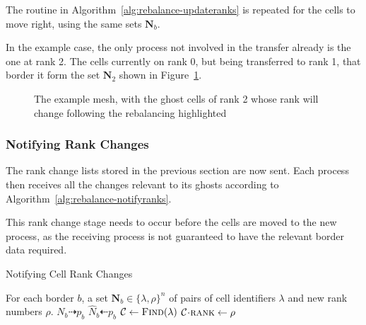 \documentclass[twoside]{IIBproject}
\newcommand{\vect} [1] {\bm{#1}}
\newcommand{\dra}{\dashrightarrow}
\newcommand{\dla}{\dashleftarrow}
\newcommand{\acc}{{\mkern 0.5mu\cdot\mkern 0.5mu}}
\numberwithin{figure}{section}
\begin{document}
            The routine in Algorithm~\ref{alg:rebalance-updateranks} is repeated for the cells to move right, using the same sets $\vect{N}_b$.

            In the example case, the only process not involved in the transfer already is the one at rank 2. The cells currently on rank 0, but being transferred to rank 1, that border it form the set $\vect{N}_2$ shown in Figure~\ref{fig:rebalance-notify}.

            \begin{figure}[!htbp]
                
                \caption{The example mesh, with the ghost cells of rank 2 whose rank will change following the rebalancing highlighted}
                \label{fig:rebalance-notify}
            \end{figure}



        \subsubsection{Notifying Rank Changes} %
            \label{sec:rebalancing-notifyrank}

            The rank change lists stored in the previous section are now sent. Each process then receives all the changes relevant to its ghosts according to Algorithm~\ref{alg:rebalance-notifyranks}.

            This rank change stage needs to occur before the cells are moved to the new process, as the receiving process is not guaranteed to have the relevant border data required.

            \begin{algorithm}[!htbp]
                \caption{Notifying Cell Rank Changes}
                \label{alg:rebalance-notifyranks}

                \begin{algorithmic}
                    \Require For each border $b$, a set $\vect{N}_b \in \{\lambda,\rho\}^n$ of pairs of cell identifiers $\lambda$ and new rank numbers $\rho$.
                    \Statex
                        \Send $N_b \dra p_b$
                    \EndFor
                    \Statex
                        \Recv $\hat N_b \dla p_b$
                            \State $\mathcal{C}\gets\textproc{Find}(\lambda)$
                            \State $\mathcal{C}\acc\textproc{rank} \gets \rho$
                        \EndFor
                    \EndFor
                \end{algorithmic}
            \end{algorithm}
\end{document}
